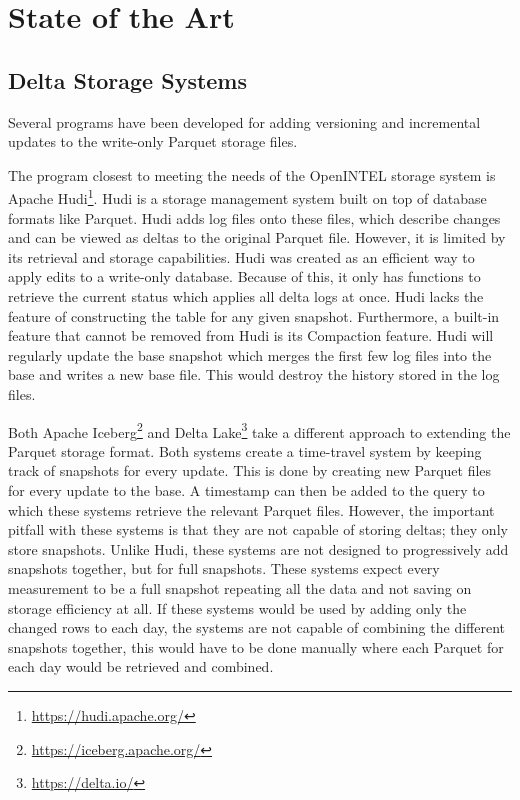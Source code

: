 \section{State of the Art}

\subsection{Delta Storage Systems}

Several programs have been developed for adding versioning and incremental updates 
to the write-only Parquet storage files. 

The program closest to meeting the needs of the OpenINTEL storage system is 
Apache Hudi\footnote{\url{https://hudi.apache.org/}}. Hudi is a storage management 
system built on top of database formats like Parquet. Hudi adds 
log files onto these files, which describe changes and can be viewed 
as deltas to the original Parquet file. However, it is limited by its retrieval and 
storage capabilities. Hudi was created as an efficient way to apply edits to a 
write-only database. Because of this, it only has functions to retrieve the current status 
which applies all delta logs at once. Hudi lacks the feature of constructing the table for 
any given snapshot. Furthermore, a built-in feature that cannot be removed from Hudi is its 
Compaction feature. Hudi will regularly update the base snapshot which merges the first few 
log files into the base and writes a new base file. This would destroy the history stored in 
the log files.

Both Apache Iceberg\footnote{\url{https://iceberg.apache.org/}} and Delta Lake\footnote{\url{https://delta.io/}} 
take a different approach to extending the Parquet storage format. Both systems create a time-travel 
system by keeping track of snapshots for every update. This is done by creating new Parquet 
files for every update to the base. A timestamp can then be added to the query to which these systems 
retrieve the relevant Parquet files. However, the important pitfall with these systems is that 
they are not capable of storing deltas; they only store snapshots. Unlike Hudi, these systems 
are not designed to progressively add snapshots together, but for full snapshots. These systems 
expect every measurement to be a full snapshot repeating all the data and not saving on storage 
efficiency at all. If these systems would be used by adding only the changed rows to each day, 
the systems are not capable of combining the different snapshots together, this would have to be 
done manually where each Parquet for each day would be retrieved and combined.

